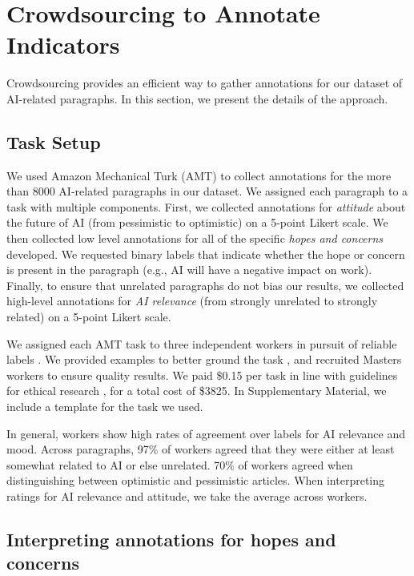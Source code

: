 \documentclass[letterpaper]{article}
\begin{document}
\section{Crowdsourcing to Annotate Indicators}

Crowdsourcing provides an efficient way to gather annotations for our dataset of AI-related paragraphs. In this section, we present the details of the approach.

\subsection{Task Setup}

We used Amazon Mechanical Turk (AMT) to collect annotations for the more than 8000 AI-related paragraphs in our dataset. We assigned each paragraph to a task with multiple components. First, we collected annotations for \textit{attitude} about the future of AI (from pessimistic to optimistic) on a 5-point Likert scale. We then collected low level annotations for all of the specific \textit{hopes and concerns} developed. We requested binary labels that indicate whether the hope or concern is present in the paragraph (e.g., AI will have a negative impact on work).
Finally, to ensure that unrelated paragraphs do not bias our results, we collected high-level annotations for \textit{AI relevance} (from strongly unrelated to strongly related) on a 5-point Likert scale.

We assigned each AMT task to three independent workers in pursuit of reliable labels \cite{get-another-label}. We provided examples to better ground the task \cite{examples}, and recruited Masters workers to ensure quality results. We paid \$0.15 per task in line with guidelines for ethical research \cite{dynamo}, for a total cost of \$3825. In Supplementary Material, we include a template for the task we used.

In general, workers show high rates of agreement over labels for AI relevance and mood. Across paragraphs, 97\% of workers agreed that they were either at least somewhat related to AI or else unrelated. 70\% of workers agreed when distinguishing between optimistic and pessimistic articles. When interpreting ratings for AI relevance and attitude, we take the average across workers.

\subsection{Interpreting annotations for hopes and concerns}
\end{document}
